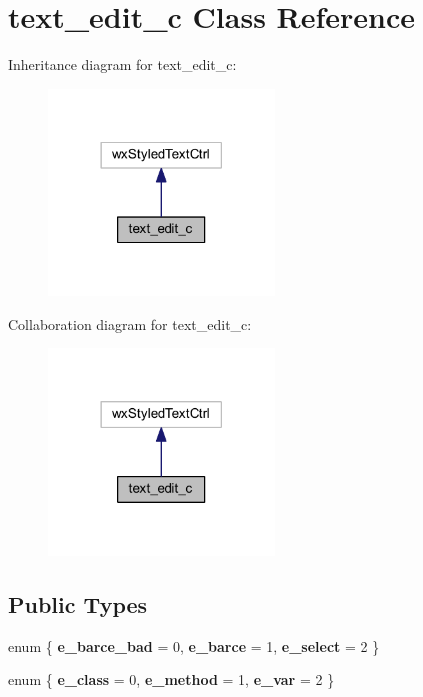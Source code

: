 \section{text\+\_\+edit\+\_\+c Class Reference}
\label{classtext__edit__c}


Inheritance diagram for text\+\_\+edit\+\_\+c\+:
\nopagebreak
\begin{figure}[H]
\begin{center}
\leavevmode
\includegraphics[width=170pt]{classtext__edit__c__inherit__graph}
\end{center}
\end{figure}


Collaboration diagram for text\+\_\+edit\+\_\+c\+:
\nopagebreak
\begin{figure}[H]
\begin{center}
\leavevmode
\includegraphics[width=170pt]{classtext__edit__c__coll__graph}
\end{center}
\end{figure}
\subsection*{Public Types}
\begin{DoxyCompactItemize}
\item 
\mbox{\label{classtext__edit__c_a99fb83031ce9923c84392b4e92f956b5}} 
enum \{ {\bfseries e\+\_\+barce\+\_\+bad} = 0, 
{\bfseries e\+\_\+barce} = 1, 
{\bfseries e\+\_\+select} = 2
 \}
\item 
\mbox{\label{classtext__edit__c_abc6126af1d45847bc59afa0aa3216b04}} 
enum \{ {\bfseries e\+\_\+class} = 0, 
{\bfseries e\+\_\+method} = 1, 
{\bfseries e\+\_\+var} = 2
 \}
\end{DoxyCompactItemize}
